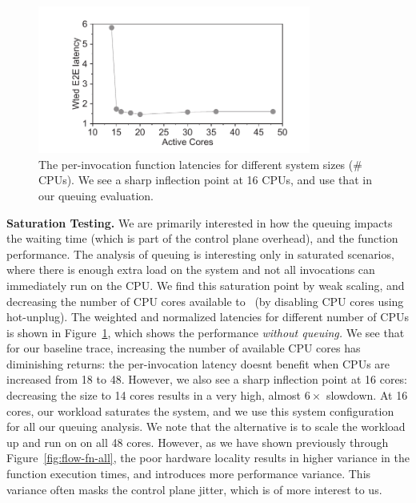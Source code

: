 \begin{figure}
  \centering 
  \includegraphics[width=0.8\textwidth]{iluvatar/graphs/scaling/WeakScaling.pdf}
  \caption{The per-invocation function latencies for different system sizes (\# CPUs). We see a sharp inflection point at 16 CPUs, and use that in our queuing evaluation.}
  \label{fig:weak}
\end{figure}


\noindent \textbf{Saturation Testing.}
We are primarily interested in how the queuing impacts the waiting time (which is part of the control plane overhead), and the function performance.
The analysis of queuing is interesting only in saturated scenarios, where there is enough extra load on the system and not all invocations can immediately run on the CPU.
We find this saturation point by weak scaling, and decreasing the number of CPU cores available to \sysname~(by disabling CPU cores using hot-unplug). 
The weighted and normalized latencies for different number of CPUs is shown in Figure~\ref{fig:weak}, which shows the performance \emph{without queuing.}
We see that for our baseline trace, increasing the number of available CPU cores has diminishing returns: the per-invocation latency doesnt benefit when CPUs are increased from 18 to 48.
However, we also see a sharp inflection point at 16 cores: decreasing the size to 14 cores results in a very high, almost $6\times$ slowdown. 
At 16 cores, our workload saturates the system, and we use this system configuration for all our queuing analysis.
We note that the alternative is to scale the workload up and run on on all 48 cores.
However, as we have shown previously through Figure~\ref{fig:flow-fn-all}, the poor hardware locality results in higher variance in the function execution times, and introduces more performance variance.
This variance often masks the control plane jitter, which is of more interest to us. 

